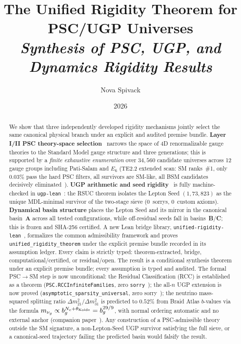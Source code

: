 \documentclass[11pt,twocolumn]{article}
\title{\bfseries The Unified Rigidity Theorem for PSC/UGP Universes\\
\large\itshape Synthesis of PSC, UGP, and Dynamics Rigidity Results}
\author{Nova Spivack}
\date{2026}
\theoremstyle{remark}
\begin{document}
\maketitle
\NovaZenodoAfterTitle

\begin{abstract}
We show that three independently developed rigidity mechanisms jointly select the same canonical
physical branch under an explicit and audited premise bundle.
\textbf{Layer I/II PSC theory-space selection}~\cite{SpivackPhysicsPortal,Spivack2025_FirstPrinciplesSM}
narrows the space of 4D renormalizable gauge theories to the Standard Model gauge structure and
three generations; this is supported by a \emph{finite exhaustive enumeration} over
$34{,}560$ candidate universes across 12 gauge groups including Pati-Salam and $E_6$
(TE2.2 extended scan: SM ranks~\#1, only $0.03\%$ pass the hard PSC filters,
all survivors are SM-like, all BSM candidates decisively eliminated~\cite{SpivackPSCConcordance}).
\textbf{UGP arithmetic and seed rigidity}~\cite{Spivack2025_UGPUniqueness,spivack2025main_ugp_paper}
is fully machine-checked in \texttt{ugp-lean}~\cite{ugp-lean}: the RSUC theorem isolates
the Lepton Seed $(1,73,823)$ as the unique MDL-minimal survivor of the two-stage sieve
(0~sorrys, 0~custom axioms).
\textbf{Dynamical basin structure} places the Lepton Seed and its mirror in the canonical
basin~\textbf{A} across all tested configurations, while off-residual seeds fall in
basins~\textbf{B}/\textbf{C}; this is frozen and SHA-256 certified.
A new Lean bridge library, \texttt{unified-rigidity-lean}~\cite{unified-rigidity-lean},
formalizes the common admissibility framework and proves \texttt{unified\_rigidity\_theorem}
under the explicit premise bundle recorded in its assumption ledger.
Every claim is strictly typed: theorem-extracted, bridge, computational/certified, or
residual/open.
The result is a conditional synthesis theorem under an explicit premise bundle; every
assumption is typed and audited.
The formal PSC$\to$SM step is now unconditional: the Residual Classification (RCC) is established as a theorem (\texttt{PSC.RCCInfiniteFamilies}, zero \texttt{sorry}~\cite{ugp-lean});
the all-$n$ UGP extension is now proved (\texttt{asymptotic\_sparsity\_universal}, zero sorry~\cite{Spivack2026_Uniqueness25}); the neutrino mass-squared splitting ratio $\Delta m^2_{21}/\Delta m^2_{31}$ is predicted to $0.52\%$ from Braid Atlas $b$-values via the formula $m_{\nu_g} \propto b_g^{N_c + \theta_{\rm Koide}} = b_g^{29/9}$, with normal ordering automatic and no external anchor (companion paper~\cite{Spivack2026_SM_UGP}).
Any construction of a PSC-admissible theory outside the SM signature, a non-Lepton-Seed UGP
survivor satisfying the full sieve, or a canonical-seed trajectory failing the predicted basin
would falsify the result.
\end{abstract}
\end{document}

